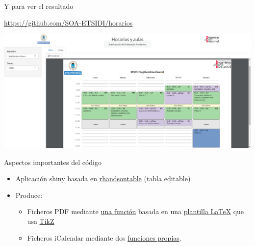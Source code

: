 \documentclass[spanish, xcolor={usenames,svgnames,dvipsnames}]{beamer}
\begin{document}
\begin{frame}[label={sec:org752caa6}]{Y para ver el resultado}
\begin{block}{}
\url{https://github.com/SOA-ETSIDI/horarios}

\begin{center}
\includegraphics[width=.9\linewidth]{images/horarios_tt.png}
\end{center}
\end{block}
\end{frame}

\begin{frame}[label={sec:org7e0a117}]{Aspectos importantes del código}
\begin{itemize}
\item Aplicación shiny basada en \href{http://jrowen.github.io/rhandsontable/}{rhandsontable} (tabla editable)
\item Produce:
\begin{itemize}
\item Ficheros PDF mediante \href{https://github.com/SOA-ETSIDI/horarios/blob/master/csv2tt.R}{una función} basada en una \href{https://github.com/SOA-ETSIDI/horarios/blob/master/timetable.tex}{plantilla \LaTeX{}} que usa \href{https://en.wikipedia.org/wiki/PGF/TikZ}{TikZ}
\item Ficheros iCalendar mediante dos \href{https://github.com/SOA-ETSIDI/misc/blob/master/funciones.R}{funciones propias}.
\end{itemize}
\end{itemize}
\end{frame}
\end{document}
